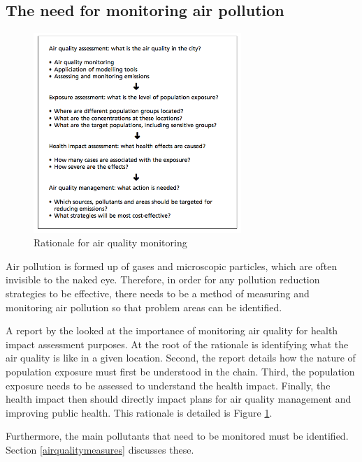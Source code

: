 \documentclass[11pt,twosided,a4paper]{report}
\begin{document}
\subsection{The need for monitoring air pollution}

\begin{figure}[!htb]
\centering
\includegraphics[width=0.7\textwidth]{Rationale_for_air_quality_monitoring}
\caption{Rationale for air quality monitoring \citep{WHO2002ambientmonitoring}}
\label{rationaleformonitoring}
\end{figure}


Air pollution is formed up of gases and microscopic particles, which are often invisible to the naked eye. Therefore, in order for any pollution reduction strategies to be effective, there needs to be a method of measuring and monitoring air pollution so that problem areas can be identified.

A report by the \cite{WHO2002ambientmonitoring} looked at the importance of monitoring air quality for health impact assessment purposes. At the root of the rationale is identifying what the air quality is like in a given location. Second, the report details how the nature of population exposure must first be understood in the chain. Third, the population exposure needs to be assessed to understand the health impact. Finally, the health impact then should directly impact plans for air quality management and improving public health. This rationale is detailed is Figure \ref{rationaleformonitoring}.

Furthermore, the main pollutants that need to be monitored must be identified. Section \ref{airqualitymeasures} discusses these.
    
\end{document}
